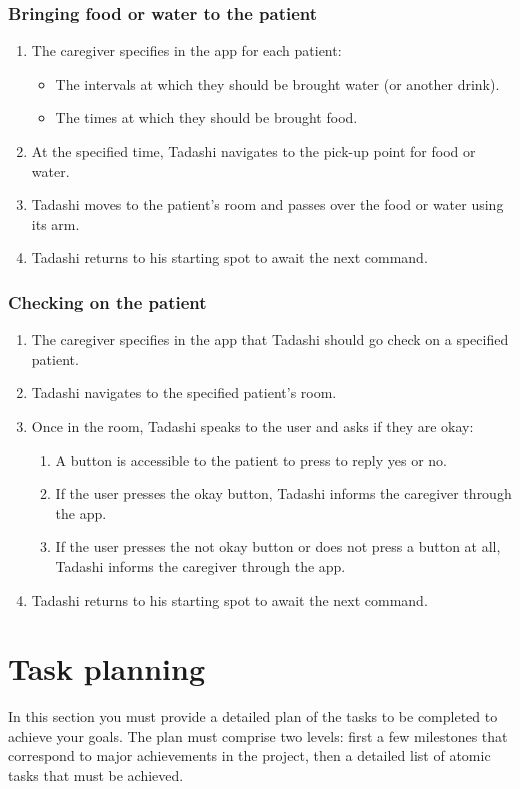 \documentclass{article}
\begin{document}
\subsubsection{Bringing food or water to the patient}
\begin{enumerate}
\item The caregiver specifies in the app for each patient:
  \begin{itemize}
  \item The intervals at which they should be brought water (or another drink).
  \item The times at which they should be brought food.
  \end{itemize}
\item At the specified time, Tadashi navigates to the pick-up point for food or water.
\item Tadashi moves to the patient's room and passes over the food or water using its arm.
\item Tadashi returns to his starting spot to await the next command.
\end{enumerate}


\subsubsection{Checking on the patient}
\begin{enumerate}
\item The caregiver specifies in the app that Tadashi should go check on a specified patient. 
\item Tadashi navigates to the specified patient's room.
\item Once in the room, Tadashi speaks to the user and asks if they are okay:
  \begin{enumerate}
  \item A button is accessible to the patient to press to reply yes or no.
  \item If the user presses the okay button, Tadashi informs the caregiver through the app. 
  \item If the user presses the not okay button or does not press a button at all, Tadashi informs the caregiver through the app.
  \end{enumerate}
\item Tadashi returns to his starting spot to await the next command. 
\end{enumerate}

\section{Task planning}
In this section you must provide a detailed plan of the tasks to be completed to achieve your goals. The plan must comprise two levels: first a few milestones that correspond to major achievements in the project, then a detailed list of atomic tasks that must be achieved.
\end{document}
